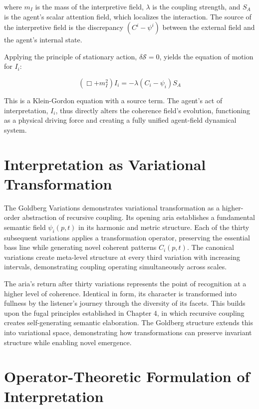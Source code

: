 where \(m_I\) is the mass of the interpretive field, \(\lambda\) is the coupling strength, and \(S_A\) is the agent's scalar attention field, which localizes the interaction. The source of the interpretive field is the discrepancy \((C^i - \psi^i)\) between the external field and the agent's internal state.

Applying the principle of stationary action, \(\delta \mathcal{S} = 0\), yields the equation of motion for \(I_i\):

\begin{equation}
(\Box + m_I^2) I_i = -\lambda (C_i - \psi_i) S_A
\end{equation}

This is a Klein-Gordon equation with a source term. The agent's act of interpretation, \(I_i\), thus directly alters the coherence field's evolution, functioning as a physical driving force and creating a fully unified agent-field dynamical system.

\section{Interpretation as Variational Transformation}

The Goldberg Variations \autocite{Bach1741} demonstrates variational transformation as a higher-order abstraction of recursive coupling. Its opening aria establishes a fundamental semantic field \(\psi_i(p,t)\) in its harmonic and metric structure. Each of the thirty subsequent variations applies a transformation operator, preserving the essential bass line while generating novel coherent patterns \(C_i(p,t)\). The canonical variations create meta-level structure at every third variation with increasing intervals, demonstrating coupling operating simultaneously across scales.

The aria's return after thirty variations represents the point of recognition at a higher level of coherence. Identical in form, its character is transformed into fullness by the listener's journey through the diversity of its facets. This builds upon the fugal principles established in Chapter 4, in which recursive coupling creates self-generating semantic elaboration. The Goldberg structure extends this into variational space, demonstrating how transformations can preserve invariant structure while enabling novel emergence.

\section{Operator-Theoretic Formulation of Interpretation}

